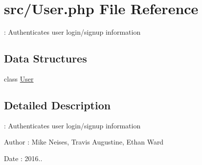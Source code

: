 \hypertarget{_user_8php}{}\section{src/\+User.php File Reference}
\label{_user_8php}


\+: Authenticates user login/signup information  


\subsection*{Data Structures}
\begin{DoxyCompactItemize}
\item 
class \hyperlink{class_user}{User}
\end{DoxyCompactItemize}


\subsection{Detailed Description}
\+: Authenticates user login/signup information 

\begin{DoxyAuthor}{Author}
\+: Mike Neises, Travis Augustine, Ethan Ward 
\end{DoxyAuthor}
\begin{DoxyDate}{Date}
\+: 2016.. 
\end{DoxyDate}
